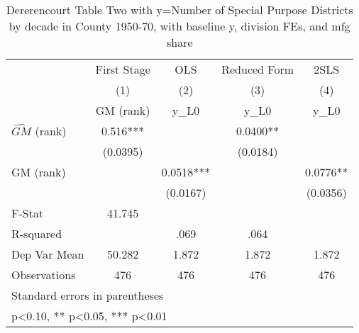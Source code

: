 \begin{table}[htbp]\centering
\def\sym#1{\ifmmode^{#1}\else\(^{#1}\)\fi}
\caption{Dererencourt Table Two with y=Number of Special Purpose Districts by decade in County 1950-70, with baseline y, division FEs, and mfg share}
\begin{tabular}{l*{4}{c}}
\toprule
                    & First Stage   &         OLS   &Reduced Form   &        2SLS   \\
                    &\multicolumn{1}{c}{(1)}&\multicolumn{1}{c}{(2)}&\multicolumn{1}{c}{(3)}&\multicolumn{1}{c}{(4)}\\
                    &\multicolumn{1}{c}{GM  (rank)}&\multicolumn{1}{c}{y\_L0}&\multicolumn{1}{c}{y\_L0}&\multicolumn{1}{c}{y\_L0}\\
\midrule
$\hat{GM}$ (rank)   &       0.516***&               &      0.0400** &               \\
                    &    (0.0395)   &               &    (0.0184)   &               \\
\addlinespace
GM  (rank)          &               &      0.0518***&               &      0.0776** \\
                    &               &    (0.0167)   &               &    (0.0356)   \\
\midrule
F-Stat              &      41.745   &               &               &               \\
R-squared           &               &        .069   &        .064   &               \\
Dep Var Mean        &      50.282   &       1.872   &       1.872   &       1.872   \\
Observations        &         476   &         476   &         476   &         476   \\
\bottomrule
\multicolumn{5}{l}{\footnotesize Standard errors in parentheses}\\
\multicolumn{5}{l}{\footnotesize * p<0.10, ** p<0.05, *** p<0.01}\\
\end{tabular}
\end{table}
